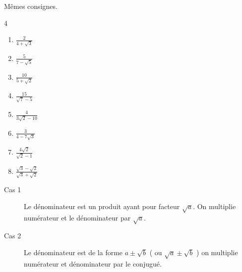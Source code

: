 \begin{exercise}[À vous] \label{chap02:exo:identite:radicaux2} Mêmes consignes.
	\begin{multicols}{4}
		\begin{enumerate}[label={$\Alph*=$\rule{0pt}{1.8em}},leftmargin=*]
			\item  $\frac{2}{4+\sqrt{3}}$
			\item $\frac{5}{7-\sqrt{5}}$
			\item $\frac{10}{5+\sqrt{2}}$
			\item $\frac{15}{\sqrt{7}-5}$
			\item $\frac{4}{3\sqrt{2}-10}$
			\item $\frac{3}{4-7\sqrt{3}}$
			\item $\frac{4\sqrt{2}}{\sqrt{2}-1}$
			\item $\frac{\sqrt{3}-\sqrt{2}}{\sqrt{3}+\sqrt{2}}$
		\end{enumerate}
	\end{multicols}
\end{exercise}



\begin{tBox}[frametitle={Transformer les fractions pour rendre le dénominateur entier} ] 
	\begin{description}
		\item[Cas 1] Le dénominateur est un produit ayant pour facteur $\sqrt{a} $.  
		On multiplie numérateur et le dénominateur par $\sqrt{a} $. 
		\item[Cas 2] Le dénominateur est de la forme $a\pm\sqrt{b}$  ( ou $\sqrt{a}\pm\sqrt{b}$ ) on multiplie numérateur et dénominateur par le conjugué.  
	\end{description}
\end{tBox}


